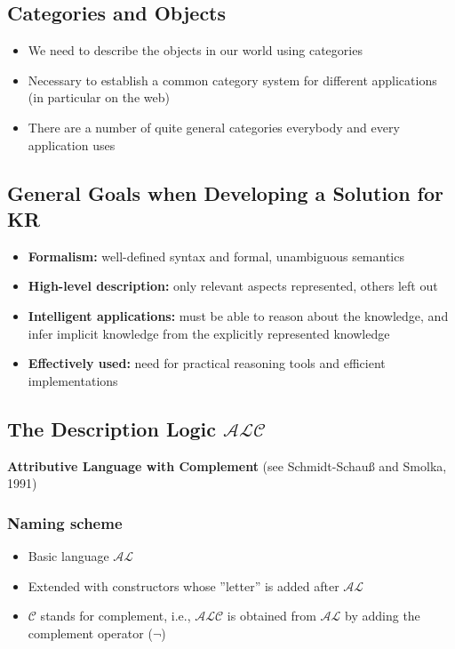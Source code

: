 \documentclass[conference]{styles/acmsiggraph}
\begin{document}
    \subsection{Categories and Objects}
        \begin{itemize}
            \item We need to describe the objects in our world using categories
            \item Necessary to establish a common category system for different applications (in particular on the web)
            \item There are a number of quite general categories everybody and every application uses
        \end{itemize}
    
    \subsection{General Goals when Developing a Solution for KR}
        \begin{itemize}
            \item \textbf{Formalism:} well-defined syntax and formal, unambiguous semantics
            \item \textbf{High-level description:} only relevant aspects represented, others left out
            \item \textbf{Intelligent applications:} must be able to reason about the knowledge, and infer implicit knowledge from the explicitly represented knowledge
            \item \textbf{Effectively used:} need for practical reasoning tools and efficient implementations
        \end{itemize}
    
    
    
    
    
    
    \subsection{The Description Logic $\mathcal{ALC}$}
        \textbf{Attributive Language with Complement} (see Schmidt-Schauß and Smolka, 1991)
        \subsubsection{Naming scheme}
            \begin{itemize}
                \item Basic language $\mathcal{AL}$
                \item Extended with constructors whose ''letter'' is added after $\mathcal{AL}$
                \item $\mathcal{C}$ stands for complement, i.e., $\mathcal{ALC}$ is obtained from $\mathcal{AL}$ by adding the complement operator ($\lnot$)
            \end{itemize}
        
\end{document}
